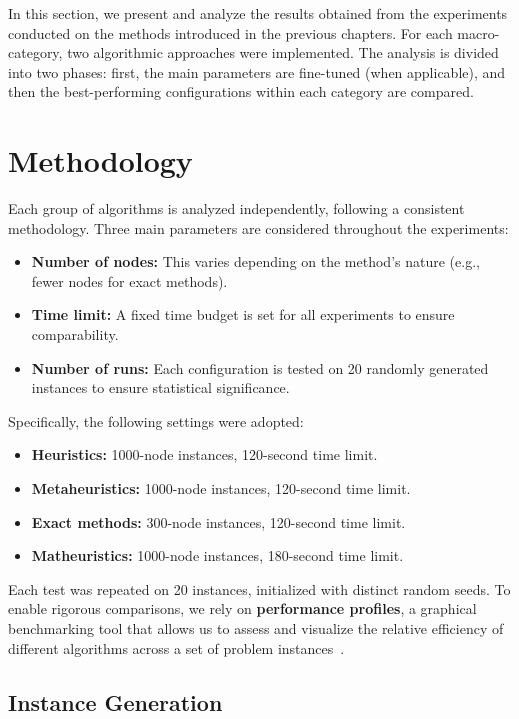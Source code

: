 In this section, we present and analyze the results obtained from the experiments conducted on the methods introduced in the previous chapters. For each macro-category, two algorithmic approaches were implemented. The analysis is divided into two phases: first, the main parameters are fine-tuned (when applicable), and then the best-performing configurations within each category are compared.

\section{Methodology}

Each group of algorithms is analyzed independently, following a consistent methodology. Three main parameters are considered throughout the experiments:
\begin{itemize}
    \item \textbf{Number of nodes:} This varies depending on the method's nature (e.g., fewer nodes for exact methods).
    \item \textbf{Time limit:} A fixed time budget is set for all experiments to ensure comparability.
    \item \textbf{Number of runs:} Each configuration is tested on 20 randomly generated instances to ensure statistical significance.
\end{itemize}

Specifically, the following settings were adopted:
\begin{itemize}
    \item \textbf{Heuristics:} 1000-node instances, 120-second time limit.
    \item \textbf{Metaheuristics:} 1000-node instances, 120-second time limit.
    \item \textbf{Exact methods:} 300-node instances, 120-second time limit.
    \item \textbf{Matheuristics:} 1000-node instances, 180-second time limit.
\end{itemize}

Each test was repeated on 20 instances, initialized with distinct random seeds. To enable rigorous comparisons, we rely on \textbf{performance profiles}, a graphical benchmarking tool that allows us to assess and visualize the relative efficiency of different algorithms across a set of problem instances~\cite{dolan2002performance}.

\subsection{Instance Generation}

